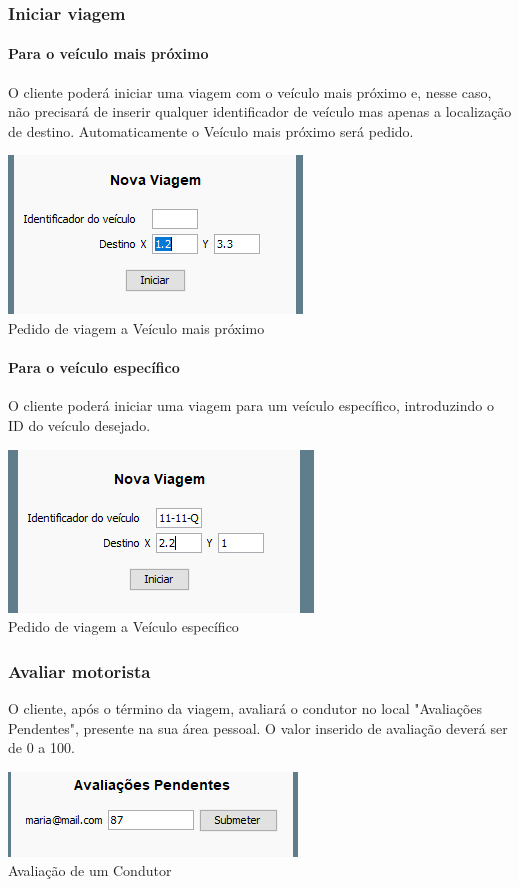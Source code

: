 \documentclass[a4paper]{article}
\begin{document}
\subsubsection{Iniciar viagem}
\paragraph{Para o veículo mais próximo}
O cliente poderá iniciar uma viagem com o veículo mais próximo e, nesse caso, não precisará de inserir qualquer identificador de veículo mas apenas a localização de destino. Automaticamente o Veículo mais próximo será pedido.
\begin{center}
  \includegraphics[scale=0.90]{cliente_viagemprox}\\
  \caption{Pedido de viagem a Veículo mais próximo}
  \label{fig:picture}
\end{center}
\paragraph{Para o veículo específico}
O cliente poderá iniciar uma viagem para um veículo específico, introduzindo o ID do veículo desejado.
\begin{center}
  \includegraphics[scale=0.90]{cliente_viagemid}\\
  \caption{Pedido de viagem a Veículo específico}
  \label{fig:picture}
\end{center}
\subsubsection{Avaliar motorista}
O cliente, após o término da viagem, avaliará o condutor no local "Avaliações Pendentes", presente na sua área pessoal. O valor inserido de avaliação deverá ser de 0 a 100.
\begin{center}
  \includegraphics[scale=0.90]{cliente_avaliacao}\\
  \caption{Avaliação de um Condutor}
  \label{fig:picture}
\end{center}
\end{document}
